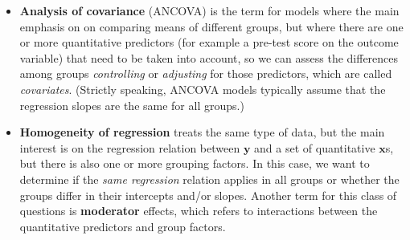 \documentclass[
  letterpaper,
  10pt,
  krantz2]{krantz}
\begin{document}
\begin{itemize}
\item
  \textbf{Analysis of covariance} (ANCOVA) is the term for models where
  the main emphasis on on comparing means of different groups, but where
  there are one or more quantitative predictors (for example a pre-test
  score on the outcome variable) that need to be taken into account, so
  we can assess the differences among groups \emph{controlling} or
  \emph{adjusting} for those predictors, which are called
  \emph{covariates}. (Strictly speaking, ANCOVA models typically assume
  that the regression slopes are the same for all groups.)
\item
  \textbf{Homogeneity of regression} treats the same type of data, but
  the main interest is on the regression relation between \(\mathbf{y}\)
  and a set of quantitative \(\mathbf{x}\)s, but there is also one or
  more grouping factors. In this case, we want to determine if the
  \emph{same regression} relation applies in all groups or whether the
  groups differ in their intercepts and/or slopes. Another term for this
  class of questions is \textbf{moderator} effects, which refers to
  interactions between the quantitative predictors and group factors.
\end{itemize}
\end{document}
